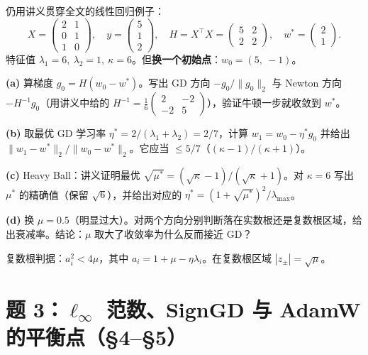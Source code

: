 \documentclass[12pt,a4paper]{article}
\begin{document}
仍用讲义贯穿全文的线性回归例子：
\[
X = \begin{pmatrix} 2 & 1 \\ 0 & 1 \\ 1 & 0 \end{pmatrix},\quad y = \begin{pmatrix} 5 \\ 1 \\ 2 \end{pmatrix},\quad H = X^\top X = \begin{pmatrix} 5 & 2 \\ 2 & 2 \end{pmatrix},\quad w^* = \begin{pmatrix} 2 \\ 1 \end{pmatrix}.
\]
特征值 $\lambda_1 = 6,\ \lambda_2 = 1,\ \kappa = 6$。但\textbf{换一个初始点}：$w_0 = (5,\ -1)$。

\textbf{(a)} 算梯度 $g_0 = H(w_0 - w^*)$。写出 GD 方向 $-g_0/\|g_0\|_2$ 与 Newton 方向 $-H^{-1} g_0$（用讲义中给的 $H^{-1} = \tfrac{1}{6}\begin{pmatrix}2&-2\\-2&5\end{pmatrix}$），验证牛顿一步就收敛到 $w^*$。

\textbf{(b)} 取最优 GD 学习率 $\eta^* = 2/(\lambda_1 + \lambda_2) = 2/7$，计算 $w_1 = w_0 - \eta^* g_0$ 并给出 $\|w_1 - w^*\|_2/\|w_0 - w^*\|_2$。它应当 $\le 5/7$（$(\kappa{-}1)/(\kappa{+}1)$）。

\textbf{(c)} Heavy Ball：讲义证明最优 $\sqrt{\mu^*} = (\sqrt\kappa - 1)/(\sqrt\kappa + 1)$。对 $\kappa = 6$ 写出 $\mu^*$ 的精确值（保留 $\sqrt 6$），并给出对应的 $\eta^* = (1 + \sqrt{\mu^*})^2/\lambda_{\max}$。

\textbf{(d)} 换 $\mu = 0.5$（明显过大）。对两个方向分别判断落在实数根还是复数根区域，给出衰减率。结论：$\mu$ 取大了收敛率为什么反而接近 GD？

\begin{hintbox}
复数根判据：$a_i^2 < 4\mu$，其中 $a_i = 1 + \mu - \eta\lambda_i$。在复数根区域 $|z_\pm| = \sqrt\mu$。
\end{hintbox}

\section*{题 3：$\ell_\infty$ 范数、SignGD 与 AdamW 的平衡点（§4–§5）}
\end{document}
